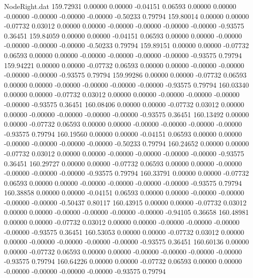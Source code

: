 \begin{filecontents}{NodeRight.dat}
 159.72931    0.00000    0.00000    -0.04151    0.06593    0.00000    0.00000   -0.00000   -0.00000   -0.00000   -0.00000   -0.50233    0.79794
 159.80014    0.00000    0.00000    -0.07732    0.03012    0.00000    0.00000   -0.00000   -0.00000   -0.00000   -0.00000   -0.93575    0.36451
 159.84059    0.00000    0.00000    -0.04151    0.06593    0.00000    0.00000   -0.00000   -0.00000   -0.00000   -0.00000   -0.50233    0.79794
 159.89151    0.00000    0.00000    -0.07732    0.06593    0.00000    0.00000   -0.00000   -0.00000   -0.00000   -0.00000   -0.93575    0.79794
 159.94221    0.00000    0.00000    -0.07732    0.06593    0.00000    0.00000   -0.00000   -0.00000   -0.00000   -0.00000   -0.93575    0.79794
 159.99286    0.00000    0.00000    -0.07732    0.06593    0.00000    0.00000   -0.00000   -0.00000   -0.00000   -0.00000   -0.93575    0.79794
 160.03340    0.00000    0.00000    -0.07732    0.03012    0.00000    0.00000   -0.00000   -0.00000   -0.00000   -0.00000   -0.93575    0.36451
 160.08406    0.00000    0.00000    -0.07732    0.03012    0.00000    0.00000   -0.00000   -0.00000   -0.00000   -0.00000   -0.93575    0.36451
 160.13492    0.00000    0.00000    -0.07732    0.06593    0.00000    0.00000   -0.00000   -0.00000   -0.00000   -0.00000   -0.93575    0.79794
 160.19560    0.00000    0.00000    -0.04151    0.06593    0.00000    0.00000   -0.00000   -0.00000   -0.00000   -0.00000   -0.50233    0.79794
 160.24652    0.00000    0.00000    -0.07732    0.03012    0.00000    0.00000   -0.00000   -0.00000   -0.00000   -0.00000   -0.93575    0.36451
 160.29727    0.00000    0.00000    -0.07732    0.06593    0.00000    0.00000   -0.00000   -0.00000   -0.00000   -0.00000   -0.93575    0.79794
 160.33791    0.00000    0.00000    -0.07732    0.06593    0.00000    0.00000   -0.00000   -0.00000   -0.00000   -0.00000   -0.93575    0.79794
 160.38858    0.00000    0.00000    -0.04151    0.06593    0.00000    0.00000   -0.00000   -0.00000   -0.00000   -0.00000   -0.50437    0.80117
 160.43915    0.00000    0.00000    -0.07732    0.03012    0.00000    0.00000   -0.00000   -0.00000   -0.00000   -0.00000   -0.94105    0.36658
 160.48981    0.00000    0.00000    -0.07732    0.03012    0.00000    0.00000   -0.00000   -0.00000   -0.00000   -0.00000   -0.93575    0.36451
 160.53053    0.00000    0.00000    -0.07732    0.03012    0.00000    0.00000   -0.00000   -0.00000   -0.00000   -0.00000   -0.93575    0.36451
 160.60136    0.00000    0.00000    -0.07732    0.06593    0.00000    0.00000   -0.00000   -0.00000   -0.00000   -0.00000   -0.93575    0.79794
 160.64226    0.00000    0.00000    -0.07732    0.06593    0.00000    0.00000   -0.00000   -0.00000   -0.00000   -0.00000   -0.93575    0.79794

\end{filecontents}
